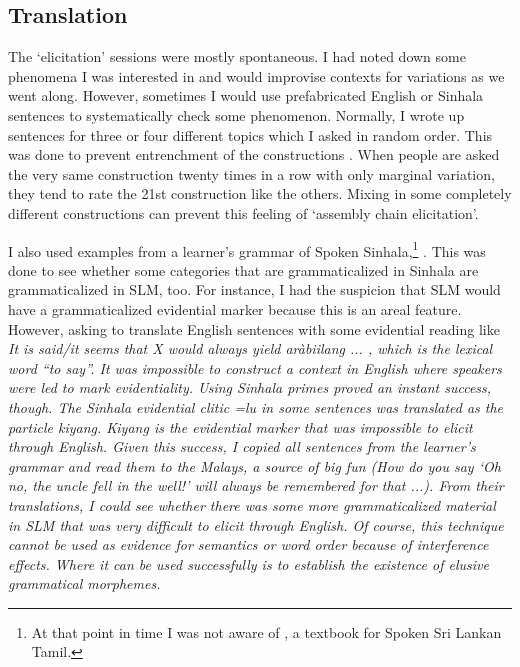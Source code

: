 
\subsection{Translation}
The `elicitation' sessions were mostly spontaneous. I had noted down some phenomena I was interested  in and would improvise contexts for variations as we went along. However, sometimes I would use prefabricated English or Sinhala sentences to systematically check some phenomenon.
Normally, I wrote up sentences for three or four different topics which I asked in random order. This was done to prevent entrenchment of the constructions \citep[134]{Schuetze1996}. When people are asked the very same construction twenty times in a row with only marginal variation, they tend to rate the 21st construction like the others. Mixing in some completely different constructions can prevent this feeling of `assembly chain elicitation'.

I also used examples from a learner's grammar of Spoken Sinhala,\footnote{At that point in time I was not aware of \citet{GairEtAl1979textbook}, a textbook for Spoken Sri Lankan Tamil.} \citet{Karunatillake2004}. This was done to see whether some categories that are grammaticalized in Sinhala are grammaticalized in SLM, too. For instance, I had the suspicion that SLM would have a grammaticalized evidential marker because this is an areal feature. However, asking to translate English sentences with some evidential reading like \em It is said/it seems that X \em would always yield \em aràbiilang ... \em, which is the lexical word ``to say''. It was impossible to construct a context in English where speakers were led to mark evidentiality. Using Sinhala primes proved an instant success, though. The Sinhala evidential clitic \em =lu \em in some sentences was translated as the particle \em kiyang\em. \em Kiyang \em is the evidential marker that was impossible to elicit through English. Given this success, I copied all sentences from the learner's grammar and read them to the Malays, a source of big fun (\em How do you say `Oh no, the uncle fell in the well!' \em will always be remembered for that ...). From their translations, I could see whether there was some more grammaticalized material in SLM that was very difficult to elicit through English. Of course, this technique cannot be used as evidence for semantics or word order because of interference effects. Where it can be used successfully is to establish the existence of elusive grammatical morphemes.


